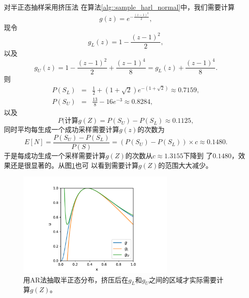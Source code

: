 \begin{example} {\hei 对半正态抽样采用挤压法} 在算法\ref{alg::sample_harl_normal}中，我们需要计算
  $$
  g(z) = e^{-\frac{(z - 1)^2}{2}},
  $$
  现令
  \begin{equation}
    g_L(z) = 1 - \frac{(z - 1)^2}{2},
    \label{eq::squeeze_ex_gl}
  \end{equation}
  以及
  \begin{equation}
    g_U(z) = 1 - \frac{(z - 1)^2}{2} + \frac{(z - 1)^4}{8}
    = g_L(z) + \frac{(z - 1)^4}{8}.
    \label{eq::squeeze_ex_gu}
  \end{equation}
  则
  \begin{eqnarray}
    P(S_L) &=& \frac{1}{2} + (1 + \sqrt{2})e^{-(1 + \sqrt{2})} \approx 0.7159,\\
    P(S_U) &=& \frac{13}{8} - 16e^{-3} \approx 0.8284,
  \end{eqnarray}
  以及
  \begin{equation}
    P(\mbox{计算}g(Z) = P(S_U) - P(S_L) \approx 0.1125,
  \end{equation}
  同时平均每生成一个成功采样需要计算$g(z)$的次数为
  \begin{equation}
    E[N] = \frac{P(S_U) - P(S_L)}{P(S)}
    = (P(S_U) - P(S_L)) \times c \approx 0.1480.
  \end{equation}
  于是每成功生成一个采样需要计算$g(Z)$的次数从$c \approx 1.3155$下降到
  了$0.1480$，效果还是很显著的。从图\ref{fig::squeeze_half_normal}也可
  以看到需要计算$g(Z)$的范围大大减少。
  \label{example::squeeze_half_normal}
\end{example}

\begin{figure}[!ht]
\centering
\includegraphics[width=0.7\textwidth]{images/squeeze.pdf}
\caption{用AR法抽取半正态分布，挤压后在$g_L$和$g_U$之间的区域才实际需要计算$g(Z)$。}
\label{fig::squeeze_half_normal}
\end{figure}

